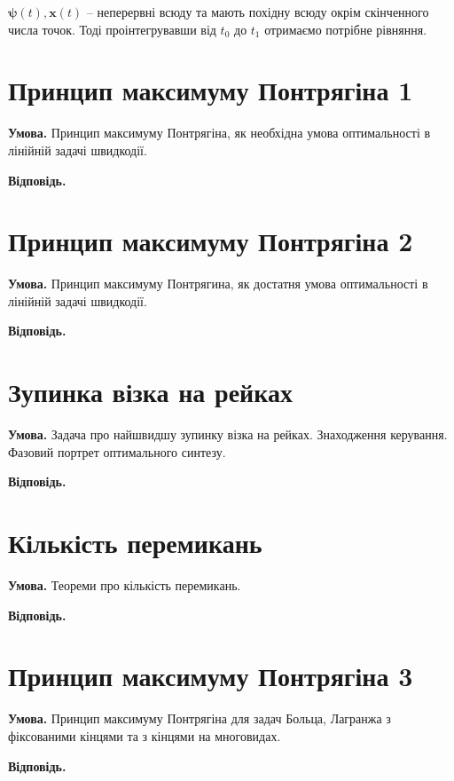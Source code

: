 \documentclass[14pt]{extarticle}
\newcommand{\<}{\langle}
\renewcommand{\>}{\rangle}
\theoremstyle{mystyle}{\newtheorem{definition}{Definition}[section]}
\theoremstyle{mystyle}{\newtheorem{proposition}[definition]{Proposition}}
\theoremstyle{mystyle}{\newtheorem{theorem}[definition]{Theorem}}
\theoremstyle{mystyle}{\newtheorem{lemma}[definition]{Lemma}}
\theoremstyle{mystyle}{\newtheorem{corollary}[definition]{Corollary}}
\theoremstyle{mystyle}{\newtheorem*{remark}{Remark}}
\theoremstyle{mystyle}{\newtheorem*{remarks}{Remarks}}
\theoremstyle{mystyle}{\newtheorem*{example}{Example}}
\theoremstyle{mystyle}{\newtheorem*{examples}{Examples}}
\theoremstyle{definition}{\newtheorem*{exercise}{Exercise}}
\theoremstyle{cstyle}{\newtheorem*{cthm}{}}
\theoremstyle{warn}
\begin{document}
$\boldsymbol{\psi}(t),\mathbf{x}(t)$ -- неперервні всюду та мають похідну всюду окрім скінченного числа точок. Тоді проінтегрувавши від $t_0$ до $t_1$ отримаємо потрібне рівняння.

\pagebreak

\section{Принцип максимуму Понтрягіна 1}

\textbf{Умова.} Принцип максимуму Понтрягіна, як необхідна умова оптимальності в лінійній задачі
швидкодії.

\textbf{Відповідь.}

\pagebreak

\section{Принцип максимуму Понтрягіна 2}

\textbf{Умова.} Принцип максимуму Понтрягина, як достатня умова оптимальності в лінійній задачі
швидкодії.

\textbf{Відповідь.}

\pagebreak

\section{Зупинка візка на рейках}

\textbf{Умова.} Задача про найшвидшу зупинку візка на рейках. Знаходження керування. Фазовий портрет
оптимального синтезу.

\textbf{Відповідь.}

\pagebreak

\section{Кількість перемикань}

\textbf{Умова.} Теореми про кількість перемикань.

\textbf{Відповідь.}

\pagebreak

\section{Принцип максимуму Понтрягіна 3}

\textbf{Умова.} Принцип максимуму Понтрягіна для задач Больца, Лагранжа з фіксованими кінцями та з
кінцями на многовидах.

\textbf{Відповідь.}
\end{document}

